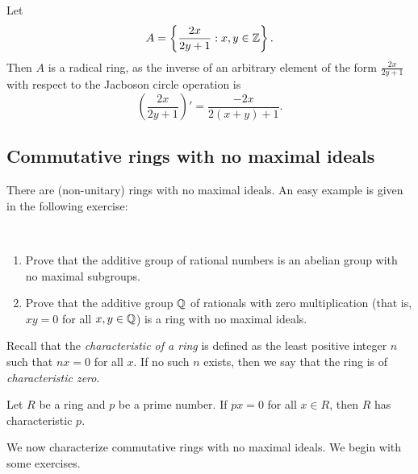 \begin{example}
	Let 
	\[
	A=\left\{\frac{2x}{2y+1}:x,y\in\mathbb{Z}\right\}.
	\]
	Then $A$ is a radical ring, as the inverse of an arbitrary element of the form $\frac{2x}{2y+1}$
	with respect to the Jacboson circle operation 
	is 
    \[
	\left(\frac{2x}{2y+1}\right)'=\frac{-2x}{2(x+y)+1}.
	\]
\end{example}

\subsection{Commutative rings with no maximal ideals}

There are (non-unitary) rings with no maximal ideals. An easy example is given in the following exercise: 

\begin{exercise}\
\label{xca:Q_no_maximals}
    \begin{enumerate}
        \item Prove that the additive group of rational numbers is an abelian group
            with no maximal subgroups.
        \item Prove that the additive group $\mathbb{Q}$ of rationals with  
            zero multiplication (that is, $xy=0$ for all $x,y\in\mathbb{Q}$) is a ring with no maximal ideals. 
    \end{enumerate}
\end{exercise}

Recall that the \emph{characteristic of a ring} is defined as the least positive
integer $n$ such that $nx=0$ for all $x$. If no such $n$ exists, 
then we say that the ring is of \emph{characteristic zero}. 

\begin{exercise}
\label{xca:characteristic}
    Let $R$ be a ring and $p$ be a prime number. 
    If $px=0$ for all $x\in R$, then $R$ has characteristic $p$. 
\end{exercise}

We now characterize commutative rings with no maximal ideals.
We begin with some exercises. 


